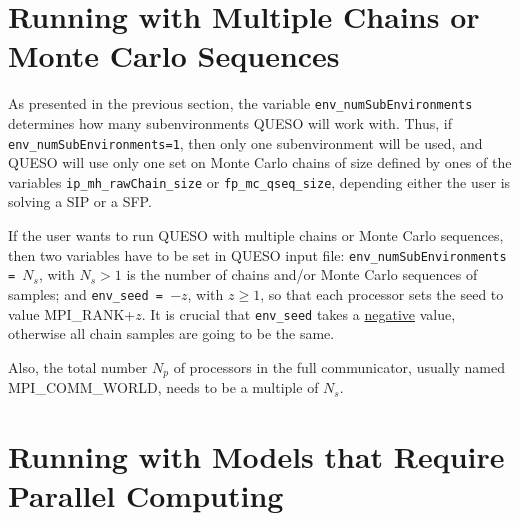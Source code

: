 \section{Running with Multiple Chains or Monte Carlo Sequences}

 
As presented in the previous section, the variable \verb+env_numSubEnvironments+ determines how many subenvironments QUESO will work with. Thus, if \verb+env_numSubEnvironments=1+, then   only one subenvironment will be used, and QUESO will use only one set on Monte Carlo chains of size defined by ones of the variables \verb+ip_mh_rawChain_size+ or \verb+fp_mc_qseq_size+, depending either the user is solving a SIP or a SFP.

If the user wants to run QUESO with multiple chains or Monte Carlo sequences, then two variables have to be set in QUESO input file: \verb+env_numSubEnvironments = +$N_s$, with $N_s>1$ is the number of chains and/or Monte Carlo sequences of samples; and \verb+env_seed = +$-z$, with $z\geqslant 1$, so that each processor sets the seed to value MPI\_RANK+$z$.
It is crucial that \verb+env_seed+ takes a \underline{negative} value, otherwise all chain samples are going to be the same.

Also, the total number $N_p$ of processors in the full communicator, usually named \linebreak MPI\_COMM\_WORLD, needs to be a multiple of $N_s$.



\section{Running with Models that Require Parallel Computing}


